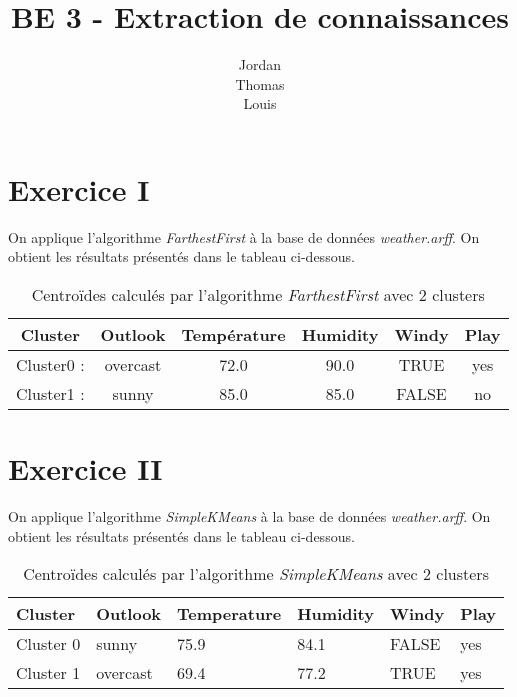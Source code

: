 \documentclass[a4paper, 11pt]{report}
\begin{document}
        \title{BE 3 - Extraction de connaissances}
        \author{Jordan \\ Thomas \\ Louis }

        \maketitle

\section{Exercice I}

        On applique l'algorithme \emph{FarthestFirst} à la base de données \emph{weather.arff}. On obtient les résultats présentés dans le tableau ci-dessous.
	\begin{table}[h!]
	\centering
	\begin{tabular}{|c|c|c|c|c|c|}
		\hline
		Cluster & Outlook & Température & Humidity & Windy & Play \\
		\hline
		Cluster0 : & overcast & 72.0 & 90.0 & TRUE & yes \\
		\hline
		Cluster1 : & sunny & 85.0 & 85.0 & FALSE & no \\
		\hline
	\end{tabular}
	\caption{Centroïdes calculés par l'algorithme \emph{FarthestFirst} avec 2 clusters}
	\label{exo1}
\end{table}

        \section{Exercice II}
        On applique l'algorithme \emph{SimpleKMeans} à la base de données \emph{weather.arff}. On obtient les résultats présentés dans le tableau ci-dessous.
        
        \begin{table}[h!]
        \centering
        \begin{tabular}{| l | l | l | l | l | l |}
        \hline
        Cluster & Outlook & Temperature & Humidity & Windy & Play \\
        \hline
        Cluster 0 & sunny & 75.9 & 84.1 & FALSE & yes \\
        \hline
        Cluster 1 & overcast & 69.4 & 77.2 & TRUE & yes \\
        \hline

        \end{tabular}
        \caption{Centroïdes calculés par l'algorithme \emph{SimpleKMeans} avec 2 clusters}
        \label{tab:exo_2}
        \end{table}
        
\end{document}
